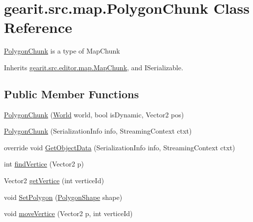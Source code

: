\hypertarget{classgearit_1_1src_1_1map_1_1_polygon_chunk}{\section{gearit.\+src.\+map.\+Polygon\+Chunk Class Reference}
\label{classgearit_1_1src_1_1map_1_1_polygon_chunk}
}


\hyperlink{classgearit_1_1src_1_1map_1_1_polygon_chunk}{Polygon\+Chunk} is a type of Map\+Chunk  




Inherits \hyperlink{classgearit_1_1src_1_1editor_1_1map_1_1_map_chunk}{gearit.\+src.\+editor.\+map.\+Map\+Chunk}, and I\+Serializable.

\subsection*{Public Member Functions}
\begin{DoxyCompactItemize}
\item 
\hyperlink{classgearit_1_1src_1_1map_1_1_polygon_chunk_a8388bcb4c7fc4a487f981347dadb2803}{Polygon\+Chunk} (\hyperlink{class_farseer_physics_1_1_dynamics_1_1_world}{World} world, bool is\+Dynamic, Vector2 pos)
\item 
\hyperlink{classgearit_1_1src_1_1map_1_1_polygon_chunk_aaffe29eb9ac01404737406a8c4dd8c2a}{Polygon\+Chunk} (Serialization\+Info info, Streaming\+Context ctxt)
\item 
override void \hyperlink{classgearit_1_1src_1_1map_1_1_polygon_chunk_a7f7008b23d1450a9b6b677f37c365106}{Get\+Object\+Data} (Serialization\+Info info, Streaming\+Context ctxt)
\item 
int \hyperlink{classgearit_1_1src_1_1map_1_1_polygon_chunk_af7c06b494de14987f14191358d9d1dc6}{find\+Vertice} (Vector2 p)
\item 
Vector2 \hyperlink{classgearit_1_1src_1_1map_1_1_polygon_chunk_a30ddeb22024d795c8fefc49d0d8d5823}{get\+Vertice} (int vertice\+Id)
\item 
void \hyperlink{classgearit_1_1src_1_1map_1_1_polygon_chunk_a8cc70ce1567b52d636aea2f14f6ebc97}{Set\+Polygon} (\hyperlink{class_farseer_physics_1_1_collision_1_1_shapes_1_1_polygon_shape}{Polygon\+Shape} shape)
\item 
void \hyperlink{classgearit_1_1src_1_1map_1_1_polygon_chunk_ace6d0e104444a8a9a9a8c7522c74eff9}{move\+Vertice} (Vector2 p, int vertice\+Id)
\end{DoxyCompactItemize}
